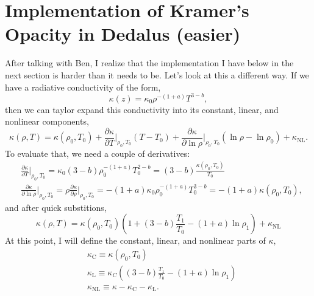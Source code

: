 \documentclass[aps, pre, onecolumn, nofootinbib, notitlepage, groupedaddress, amsfonts, amssymb, amsmath, longbibliography]{revtex4-1}
\begin{document}
\section{Implementation of Kramer's Opacity in Dedalus (easier)}
After talking with Ben, I realize that the implementation I have below in
the next section is harder than it needs to be. Let's look at this a different way.
If we have a radiative conductivity of the form,
\begin{equation}
\kappa(z) = \kappa_0 \rho^{-(1 + a)} T^{3 - b},
\end{equation}
then we can taylor expand this conductivity into its constant, linear, and
nonlinear components,
\begin{equation}
\kappa(\rho, T) = \kappa(\rho_0, T_0) 
+ \frac{\partial \kappa}{\partial T}\bigg|_{\rho_0, T_0}(T - T_0)
+ \frac{\partial \kappa}{\partial \ln\rho}\bigg|_{\rho_0, T_0}(\ln\rho - \ln\rho_0)
+ \kappa_{\text{NL}}.
\end{equation}
To evaluate that, we need a couple of derivatives:
\begin{equation}
\begin{split}
&\frac{\partial \kappa}{\partial T}\bigg|_{\rho_0, T_0} = 
\kappa_0(3-b)\rho_0^{-(1+a)}T_0^{2-b} = (3-b)\frac{\kappa(\rho_0, T_0)}{T_0} \\
&\frac{\partial \kappa}{\partial \ln\rho}\bigg|_{\rho_0, T_0} =
\rho\frac{\partial \kappa}{\partial \rho}\bigg|_{\rho_0, T_0} =
-(1+a)\kappa_0 \rho_0^{-(1+a)} T_0^{3-b} = -(1+a)\kappa(\rho_0, T_0),
\end{split}
\end{equation}
and after quick substitions,
\begin{equation}
\kappa(\rho, T) = \kappa(\rho_0, T_0)\left( 1 +
(3 - b)\frac{T_1}{T_0} - (1 + a) \ln\rho_1 \right)
+ \kappa_{\text{NL}}
\end{equation}
At this point, I will define the constant, linear, and nonlinear parts of $\kappa$,
\begin{equation}
\begin{split}
&\kappa_\text{C} \equiv \kappa(\rho_0, T_0) \\
&\kappa_\text{L} \equiv \kappa_C\left(
(3 - b)\frac{T_1}{T_0} - (1 + a) \ln\rho_1 \right) \\
&\kappa_{\text{NL}} \equiv \kappa - \kappa_\text{C} - \kappa_{\text{L}}.
\end{split}
\end{equation}
\end{document}
